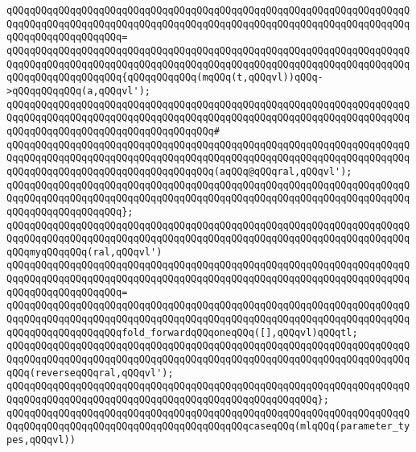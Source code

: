 \verb|qQQqqQQqqQQqqQQqqQQqqQQqqQQqqQQqqQQqqQQqqQQqqQQqqQQqqQQqqQQqqQQqqQQqqQQqqQQqqQQqqQQqqQQqqQQqqQQqqQQqqQQqqQQqqQQqqQQqqQQqqQQqqQQqqQQqqQQqqQQqqQQqqQQqqQQqqQQqqQQq=|\newline
\verb|qQQqqQQqqQQqqQQqqQQqqQQqqQQqqQQqqQQqqQQqqQQqqQQqqQQqqQQqqQQqqQQqqQQqqQQqqQQqqQQqqQQqqQQqqQQqqQQqqQQqqQQqqQQqqQQqqQQqqQQqqQQqqQQqqQQqqQQqqQQqqQQqqQQqqQQqqQQqqQQq{qQQqqQQqqQQq(mqQQq(t,qQQqvl))qQQq->qQQqqQQqqQQq(a,qQQqvl');|\newline
\verb|qQQqqQQqqQQqqQQqqQQqqQQqqQQqqQQqqQQqqQQqqQQqqQQqqQQqqQQqqQQqqQQqqQQqqQQqqQQqqQQqqQQqqQQqqQQqqQQqqQQqqQQqqQQqqQQqqQQqqQQqqQQqqQQqqQQqqQQqqQQqqQQqqQQqqQQqqQQqqQQqqQQqqQQqqQQqqQQq#|\newline
\verb|qQQqqQQqqQQqqQQqqQQqqQQqqQQqqQQqqQQqqQQqqQQqqQQqqQQqqQQqqQQqqQQqqQQqqQQqqQQqqQQqqQQqqQQqqQQqqQQqqQQqqQQqqQQqqQQqqQQqqQQqqQQqqQQqqQQqqQQqqQQqqQQqqQQqqQQqqQQqqQQqqQQqqQQqqQQqqQQq(aqQQq@qQQqral,qQQqvl');|\newline
\verb|qQQqqQQqqQQqqQQqqQQqqQQqqQQqqQQqqQQqqQQqqQQqqQQqqQQqqQQqqQQqqQQqqQQqqQQqqQQqqQQqqQQqqQQqqQQqqQQqqQQqqQQqqQQqqQQqqQQqqQQqqQQqqQQqqQQqqQQqqQQqqQQqqQQqqQQqqQQqqQQq};|\newline
\newline
\verb|qQQqqQQqqQQqqQQqqQQqqQQqqQQqqQQqqQQqqQQqqQQqqQQqqQQqqQQqqQQqqQQqqQQqqQQqqQQqqQQqqQQqqQQqqQQqqQQqqQQqqQQqqQQqqQQqqQQqqQQqqQQqqQQqqQQqqQQqqQQqqQQqmyqQQqqQQq(ral,qQQqvl')|\newline
\verb|qQQqqQQqqQQqqQQqqQQqqQQqqQQqqQQqqQQqqQQqqQQqqQQqqQQqqQQqqQQqqQQqqQQqqQQqqQQqqQQqqQQqqQQqqQQqqQQqqQQqqQQqqQQqqQQqqQQqqQQqqQQqqQQqqQQqqQQqqQQqqQQqqQQqqQQqqQQqqQQq=|\newline
\verb|qQQqqQQqqQQqqQQqqQQqqQQqqQQqqQQqqQQqqQQqqQQqqQQqqQQqqQQqqQQqqQQqqQQqqQQqqQQqqQQqqQQqqQQqqQQqqQQqqQQqqQQqqQQqqQQqqQQqqQQqqQQqqQQqqQQqqQQqqQQqqQQqqQQqqQQqqQQqqQQqfold_forwardqQQqoneqQQq([],qQQqvl)qQQqtl;|\newline
\newline
\verb|qQQqqQQqqQQqqQQqqQQqqQQqqQQqqQQqqQQqqQQqqQQqqQQqqQQqqQQqqQQqqQQqqQQqqQQqqQQqqQQqqQQqqQQqqQQqqQQqqQQqqQQqqQQqqQQqqQQqqQQqqQQqqQQqqQQqqQQqqQQqqQQq(reverseqQQqral,qQQqvl');|\newline
\verb|qQQqqQQqqQQqqQQqqQQqqQQqqQQqqQQqqQQqqQQqqQQqqQQqqQQqqQQqqQQqqQQqqQQqqQQqqQQqqQQqqQQqqQQqqQQqqQQqqQQqqQQqqQQqqQQqqQQqqQQqqQQq};|\newline
\newline
\verb|qQQqqQQqqQQqqQQqqQQqqQQqqQQqqQQqqQQqqQQqqQQqqQQqqQQqqQQqqQQqqQQqqQQqqQQqqQQqqQQqqQQqqQQqqQQqqQQqqQQqqQQqqQQqqQQqcaseqQQq(mlqQQq(parameter_types,qQQqvl))|\newline
